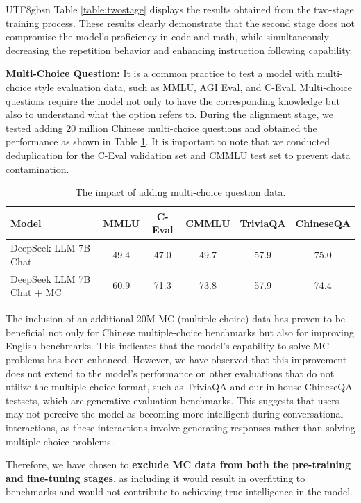 \documentclass[11pt, a4paper, logo, copyright, nonumbering]{deepseek}
\begin{document}
\begin{CJK*}{UTF8}{gbsn}
Table \ref{table:twostage} displays the results obtained from the two-stage training process. These results clearly demonstrate that the second stage does not compromise the model's proficiency in code and math, while simultaneously decreasing the repetition behavior and enhancing instruction following capability.

\textbf{Multi-Choice Question:} It is a common practice to test a model with multi-choice style evaluation data, such as MMLU, AGI Eval, and C-Eval. Multi-choice questions require the model not only to have the corresponding knowledge but also to understand what the option refers to.  During the alignment stage, we tested adding 20 million  Chinese multi-choice questions and obtained the performance as shown in Table \ref{table:mc}. It is important to note that we conducted deduplication for the C-Eval validation set and CMMLU test set to prevent data contamination. 

\begin{table}[h]
\centering  \small
\begin{tabular}{lccccc}
	\toprule
Model & MMLU & C-Eval & CMMLU  & TriviaQA & ChineseQA \\ \midrule
DeepSeek LLM 7B Chat & 49.4 & 47.0 & 49.7 & 57.9 & 75.0 \\ 
DeepSeek LLM 7B Chat + MC & 60.9 & 71.3 & 73.8 & 57.9 & 74.4 \\ 	\bottomrule
\end{tabular}
\caption{\centering The impact of adding multi-choice question data.}
\label{table:mc}
\end{table}

The inclusion of an additional 20M MC (multiple-choice) data has proven to be beneficial not only for Chinese multiple-choice benchmarks but also for improving English benchmarks. This indicates that the model's capability to solve MC problems has been enhanced. However, we have observed that this improvement does not extend to the model's performance on other evaluations that do not utilize the multiple-choice format, such as TriviaQA and our in-house ChineseQA testsets, which are generative evaluation benchmarks. This suggests that users may not perceive the model as becoming more intelligent during conversational interactions, as these interactions involve generating responses rather than solving multiple-choice problems.

Therefore, we have chosen to \textbf{exclude MC data from both the pre-training and fine-tuning stages}, as including it would result in overfitting to benchmarks and would not contribute to achieving true intelligence in the model.


\end{CJK*}
\end{document}
